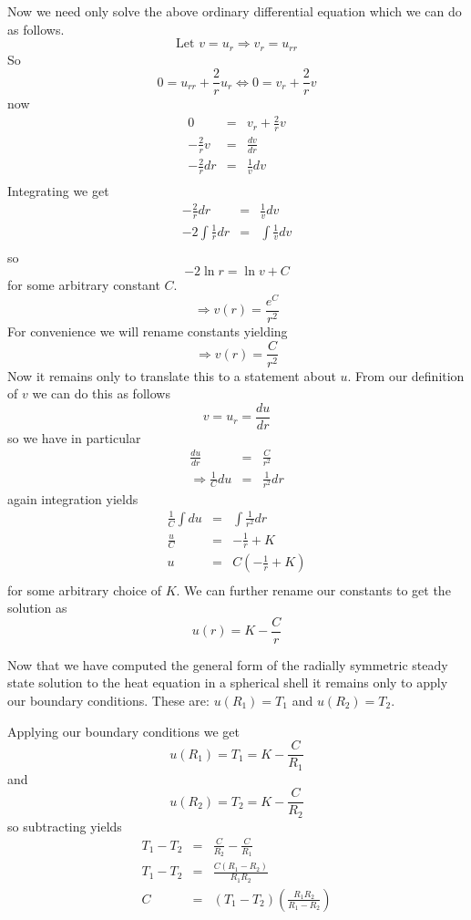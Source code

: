 \documentclass[12pt]{article}
\begin{document}
Now we need only solve the above ordinary differential equation which we can do as follows. 
\[  \text{Let } v=u_r \Rightarrow v_r=u_{rr}\]
So
\[0=  u_{rr} +\frac{2}{r} u_r \Leftrightarrow 0= v_r +\frac{2}{r} v\]
now
\begin{eqnarray*}0 &=& v_r +\frac{2}{r} v\\
-\frac{2}{r} v &=& \frac{d v}{d r} \\
-\frac{2}{r} dr &=& \frac{1}{v} dv \\
\end{eqnarray*}
Integrating we get
\begin{eqnarray*}
-\frac{2}{r} dr &=& \frac{1}{v} dv \\
- 2\int \frac{1}{r} dr &=& \int \frac{1}{v} dv \\
\end{eqnarray*}
so
\[-2 \ln{r} = \ln{v} +C\]
for some arbitrary constant $C$.
\[\Rightarrow v(r) = \frac{e^C}{r^2} \]
For convenience we will rename constants yielding
\[\Rightarrow v(r) = \frac{C}{r^2} \]
Now it remains only to translate this to a statement about $u$. From our definition of $v$ we can do this as follows
\[   v=u_r = \frac{d u}{d r}\]
so we have in particular 
\begin{eqnarray*}
\frac{d u}{d r} &=& \frac{C}{r^2} \\
 \Rightarrow \frac{1}{C} du &=& \frac{1}{r^2} dr
\end{eqnarray*}
again integration yields
\begin{eqnarray*}
\frac{1}{C}  \int du &=&  \int \frac{1}{r^2} dr \\
\frac{u}{C} &=&  - \frac{1}{r} +K  \\
u &=&C \left(  - \frac{1}{r} +K  \right) \\
\end{eqnarray*}
for some arbitrary choice of $K$. We can further rename our constants to get the solution as
\begin{equation}\label{1:gensol}u(r) =  K - \frac{C}{r} \end{equation}

Now that we have computed the general form of the radially symmetric steady state solution to the heat equation in a spherical shell it remains only to apply our boundary conditions. These are: $u(R_1)=T_1$ and $u(R_2)=T_2$.

Applying our boundary conditions we get 
\begin{equation}\label{1:eq1}u(R_1)=T_1= K - \frac{C}{R_1} \end{equation}
and
\begin{equation}\label{1:eq2}u(R_2)=T_2= K - \frac{C}{R_2} \end{equation}
so subtracting yields
\begin{eqnarray*}
T_1 - T_2  &=& \frac{C}{R_2} - \frac{C}{R_1}  \\
T_1 - T_2  &=& \frac{C (R_1 - R_2)}{R_1 R_2}  \\
C &=& \left(T_1 - T_2 \right) \left( \frac{ R_1 R_2}{R_1 - R_2} \right)  \\
\end{eqnarray*}
\end{document}
